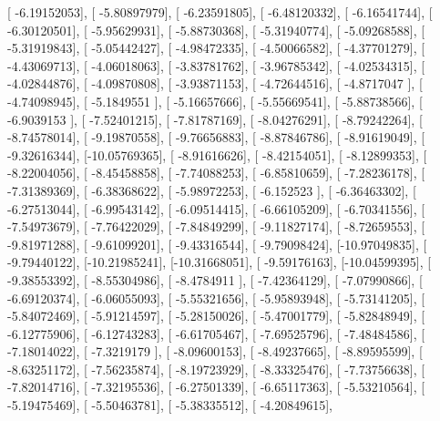 \documentclass{article}
\begin{document}
       [ -6.19152053],
       [ -5.80897979],
       [ -6.23591805],
       [ -6.48120332],
       [ -6.16541744],
       [ -6.30120501],
       [ -5.95629931],
       [ -5.88730368],
       [ -5.31940774],
       [ -5.09268588],
       [ -5.31919843],
       [ -5.05442427],
       [ -4.98472335],
       [ -4.50066582],
       [ -4.37701279],
       [ -4.43069713],
       [ -4.06018063],
       [ -3.83781762],
       [ -3.96785342],
       [ -4.02534315],
       [ -4.02844876],
       [ -4.09870808],
       [ -3.93871153],
       [ -4.72644516],
       [ -4.8717047 ],
       [ -4.74098945],
       [ -5.1849551 ],
       [ -5.16657666],
       [ -5.55669541],
       [ -5.88738566],
       [ -6.9039153 ],
       [ -7.52401215],
       [ -7.81787169],
       [ -8.04276291],
       [ -8.79242264],
       [ -8.74578014],
       [ -9.19870558],
       [ -9.76656883],
       [ -8.87846786],
       [ -8.91619049],
       [ -9.32616344],
       [-10.05769365],
       [ -8.91616626],
       [ -8.42154051],
       [ -8.12899353],
       [ -8.22004056],
       [ -8.45458858],
       [ -7.74088253],
       [ -6.85810659],
       [ -7.28236178],
       [ -7.31389369],
       [ -6.38368622],
       [ -5.98972253],
       [ -6.152523  ],
       [ -6.36463302],
       [ -6.27513044],
       [ -6.99543142],
       [ -6.09514415],
       [ -6.66105209],
       [ -6.70341556],
       [ -7.54973679],
       [ -7.76422029],
       [ -7.84849299],
       [ -9.11827174],
       [ -8.72659553],
       [ -9.81971288],
       [ -9.61099201],
       [ -9.43316544],
       [ -9.79098424],
       [-10.97049835],
       [ -9.79440122],
       [-10.21985241],
       [-10.31668051],
       [ -9.59176163],
       [-10.04599395],
       [ -9.38553392],
       [ -8.55304986],
       [ -8.4784911 ],
       [ -7.42364129],
       [ -7.07990866],
       [ -6.69120374],
       [ -6.06055093],
       [ -5.55321656],
       [ -5.95893948],
       [ -5.73141205],
       [ -5.84072469],
       [ -5.91214597],
       [ -5.28150026],
       [ -5.47001779],
       [ -5.82848949],
       [ -6.12775906],
       [ -6.12743283],
       [ -6.61705467],
       [ -7.69525796],
       [ -7.48484586],
       [ -7.18014022],
       [ -7.3219179 ],
       [ -8.09600153],
       [ -8.49237665],
       [ -8.89595599],
       [ -8.63251172],
       [ -7.56235874],
       [ -8.19723929],
       [ -8.33325476],
       [ -7.73756638],
       [ -7.82014716],
       [ -7.32195536],
       [ -6.27501339],
       [ -6.65117363],
       [ -5.53210564],
       [ -5.19475469],
       [ -5.50463781],
       [ -5.38335512],
       [ -4.20849615],
\end{document}
